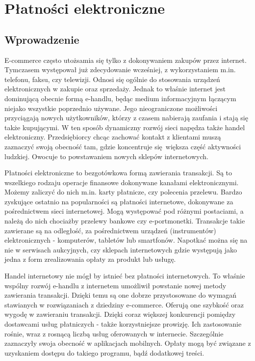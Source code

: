 \section{Płatności elektroniczne}


\subsection{Wprowadzenie}

E-commerce często utożsamia się tylko z dokonywaniem zakupów przez internet. Tymczasem występował już zdecydowanie wcześniej, z wykorzystaniem m.in. telefonu, faksu, czy telewizji. Odnosi się ogólnie do stosowania urządzeń elektronicznych w zakupie oraz sprzedaży. Jednak to właśnie internet jest dominującą obecnie formą e-handlu, będąc medium informacyjnym łączącym niejako wszystkie poprzednio używane. Jego nieograniczone możliwości przyciągają nowych użytkowników, którzy z czasem nabierają zaufania i stają się także kupującymi. W ten sposób dynamiczny rozwój sieci napędza także handel elektroniczny. Przedsiębiorcy chcąc zachować kontakt z klientami muszą zaznaczyć swoją obecność tam, gdzie koncentruje się większa część aktywności ludzkiej. Owocuje to powstawaniem nowych sklepów internetowych.

Płatności elektroniczne to bezgotówkowa formą zawierania transakcji. Są to wszelkiego rodzaju operacje finansowe dokonywane kanałami elektronicznymi. Możemy zaliczyć do nich m.in. karty płatnicze, czy polecenia przelewu. Bardzo zyskujące ostatnio na popularności są płatności internetowe, dokonywane za pośrednictwem sieci internetowej. Mogą występować pod różnymi postaciami, a należą do nich chociażby przelewy bankowe czy e-portmonetki. Transakcje takie zawierane są na odległość, za pośrednictwem urządzeń (instrumentów) elektronicznych - komputerów, tabletów lub smartfonów. Napotkać można się na nie w serwisach aukcyjnych, czy sklepach internetowych gdzie występują jako jedna z form zrealizowania opłaty za produkt lub usługę. 

Handel internetowy nie mógł by istnieć bez płatności internetowych. To właśnie wspólny rozwój e-handlu z internetem umożliwił powstanie nowej metody zawierania transakcji. Dzięki temu są one dobrze przystosowane do wymagań stawianych w rozwiązaniach z dziedziny e-commerce. Oferują one szybkość oraz wygodę w zawieraniu transakcji. Dzięki coraz większej konkurencji pomiędzy dostawcami usług płatniczych - także korzystniejsze prowizję. Ich zastosowanie rośnie, wraz z rosnącą liczbą usług oferowanych w internecie. Szczególnie zaznaczyły swoja obecność w aplikacjach mobilnych. Opłaty mogą być związane z uzyskaniem dostępu do takiego programu, bądź dodatkowej treści.

